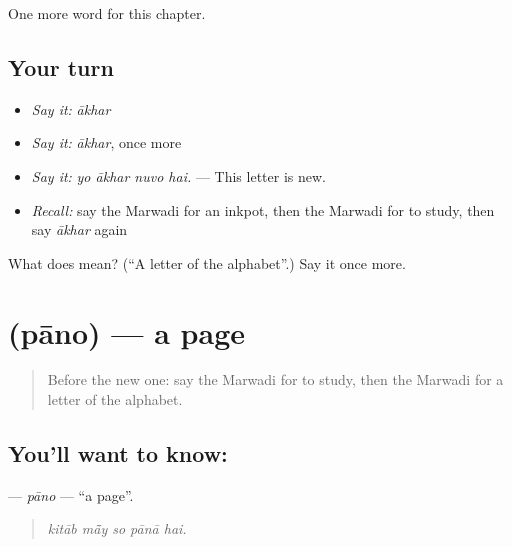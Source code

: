 \begin{grammarlens}[title={What you've built}]
One more word for this chapter.
\end{grammarlens}

\subsection*{Your turn}
\begin{itemize}
\raggedright
  \item \emph{Say it:} \emph{ākhar}
  \item \emph{Say it:} \emph{ākhar}, once more
  \item \emph{Say it:} \emph{yo ākhar nuvo hai.} — This letter is new.
  \item \emph{Recall:} say the Marwadi for an inkpot, then the Marwadi for to study, then say \emph{ākhar} again
\end{itemize}

\begin{tcolorbox}[breakable,colback=teal!4,colframe=teal!35!black,title={Before you move on}]
What does  mean? (\textquotedblleft{}A letter of the alphabet\textquotedblright{}.) Say it once more.
\end{tcolorbox}
\section[\texorpdfstring{\mw{पानो} (pāno)}{पानो (pāno)}]{ (pāno) — a page}

\label{lesson:MW-C285-pano}



\begin{quote}
Before the new one: say the Marwadi for to study, then the Marwadi for a letter of the alphabet.
\end{quote}

\subsection*{You'll want to know: }
\textbf{} — \emph{pāno} — \textquotedblleft{}a page\textquotedblright{}.

\begin{quote}
    
\end{quote}

\begin{quote}
\emph{kitāb mā̃y so pānā hai.}
\end{quote}


